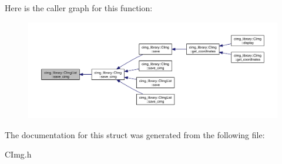 Here is the caller graph for this function\-:
\nopagebreak
\begin{figure}[H]
\begin{center}
\leavevmode
\includegraphics[width=350pt]{structcimg__library_1_1_c_img_list_af0a1d766b2ad5acff467cddb8d108475_icgraph}
\end{center}
\end{figure}




The documentation for this struct was generated from the following file\-:\begin{DoxyCompactItemize}
\item 
C\-Img.\-h\end{DoxyCompactItemize}
